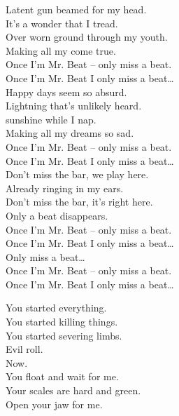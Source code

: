 Latent gun beamed for my head. \\
It's a wonder that I tread. \\
Over worn ground through my youth. \\
Making all my  come true. \\

Once I'm Mr. Beat -- only miss a beat. \\
Once I'm Mr. Beat I only miss a beat… \\

Happy days seem so absurd. \\
Lightning that's unlikely heard. \\
 sunshine while I nap. \\
Making all my dreams so sad. \\

Once I'm Mr. Beat -- only miss a beat. \\
Once I'm Mr. Beat I only miss a beat… \\

Don't miss the bar, we play here. \\
Already ringing in my ears. \\
Don't miss the bar, it's right here. \\
Only a beat disappears. \\

Once I'm Mr. Beat -- only miss a beat. \\
Once I'm Mr. Beat I only miss a beat… \\

Only miss a beat… \\

Once I'm Mr. Beat -- only miss a beat. \\
Once I'm Mr. Beat I only miss a beat… \\




You started everything. \\
You started killing things. \\
You started severing limbs. \\

Evil  roll. \\
Now. \\

You float and wait for me. \\
Your scales are hard and green. \\
Open your jaw for me. \\


